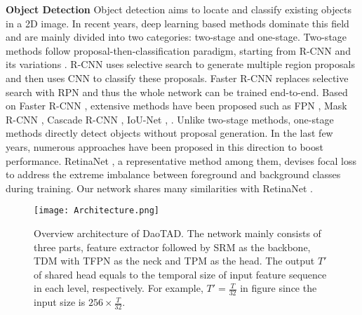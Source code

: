 \documentclass[final]{cvpr}
\begin{document}
\textbf{Object Detection}
Object detection aims to locate and classify existing objects in a 2D image. In recent years, deep learning based methods dominate this field and are mainly divided into two categories: two-stage and one-stage. Two-stage methods follow  proposal-then-classification paradigm, starting from R-CNN \cite{girshick2014rich} and its variations \cite{girshick2015fast, ren2016faster}. R-CNN \cite{girshick2014rich} uses selective search \cite{uijlings2013selective} to generate multiple region proposals and then uses CNN to classify these proposals. Faster R-CNN \cite{ren2016faster} replaces selective search with RPN and thus the whole network can be trained end-to-end. Based on Faster R-CNN \cite{ren2016faster}, extensive methods have been proposed such as FPN \cite{lin2017feature}, Mask R-CNN \cite{he2017mask}, Cascade R-CNN \cite{cai2018cascade}, IoU-Net \cite{jiang2018acquisition}, \etc. Unlike two-stage methods, one-stage methods directly detect objects without proposal generation. In the last few years, numerous approaches \cite{redmon2016you, redmon2017yolo9000, redmon2018yolov3, liu2016ssd, lin2017focal, tian2019fcos, wu2019iou, li2020generalized, wu2020iou, zheng2020distance} have been proposed in this direction to boost performance. RetinaNet \cite{lin2017focal}, a representative method among them, devises focal loss to address the extreme imbalance between foreground and background classes during training. Our network shares many similarities with RetinaNet \cite{lin2017focal}.

\begin{figure*}[htp]
    \centering
    \texttt{[image: Architecture.png]}
    \caption{Overview architecture of DaoTAD. The network mainly consists of three parts, feature extractor followed by SRM as the backbone, TDM with TFPN as the neck and TPM as the head. The output $T'$ of shared head equals to the temporal size of input feature sequence in each level, respectively. For example, $T'=\frac{T}{32}$ in figure since the input size is $256\times\frac{T}{32}$.}
    \label{network structure}
\end{figure*}
\end{document}
